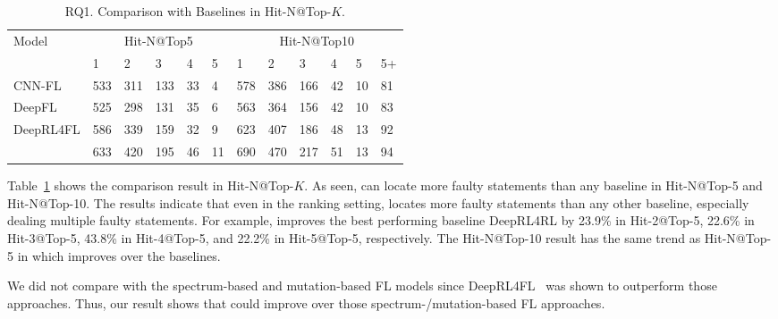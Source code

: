 





\begin{table}[t]
	\caption{RQ1. Comparison with Baselines in Hit-N@Top-$K$.}
        \vspace{-6pt}
	{\small
		\begin{center}
			\renewcommand{\arraystretch}{1}
			\begin{tabular}{p{1.5cm}<{\centering}|p{0.3cm}<{\centering}|p{0.3cm}<{\centering}|p{0.3cm}<{\centering}|p{0.2cm}<{\centering}|p{0.2cm}<{\centering}|p{0.3cm}<{\centering}|p{0.3cm}<{\centering}|p{0.3cm}<{\centering}|p{0.2cm}<{\centering}|p{0.2cm}<{\centering}|p{0.2cm}<{\centering}}
				\hline
				\multirow{2}{*}{Model}    & \multicolumn{5}{c|}{Hit-N@Top5}& \multicolumn{6}{c}{Hit-N@Top10}\\
				\cline{2-12}
											 &1&2&3&4&5&1&2&3&4&5&5+\\
				
				\hline
				CNN-FL      & 533 & 311 & 133 & 33 & 4 & 578 & 386 & 166 & 42 & 10 & 81 \\
				DeepFL		& 525 & 298 & 131 & 35 & 6 & 563 & 364 & 156 & 42 & 10 & 83 \\
				DeepRL4FL	& 586 & 339 & 159 & 32 & 9 & 623 & 407 & 186 & 48 & 13 & 92 \\
				\hline
				\tool       & 633 & 420 & 195 & 46 & 11& 690 & 470 & 217 & 51 & 13 & 94 \\
				\hline
			\end{tabular}
			
			\label{fig:rq1-2}
		\end{center}
	}
\end{table}

Table~\ref{fig:rq1-2} shows the comparison result in Hit-N@Top-$K$.
As seen, {\tool} can locate more faulty statements than any baseline
in Hit-N@Top-5 and Hit-N@Top-10. The results indicate that even in the
ranking setting, {\tool} locates more faulty statements than
any other baseline, especially dealing multiple faulty statements. For
example, {\tool} improves the best performing baseline DeepRL4RL by
23.9\% in Hit-2@Top-5, 22.6\% in Hit-3@Top-5, 43.8\% in Hit-4@Top-5,
and 22.2\% in Hit-5@Top-5, respectively. The Hit-N@Top-10 result has
the same trend as Hit-N@Top-5 in which {\tool} improves over the
baselines.

We did not compare with the spectrum-based and mutation-based FL
models since DeepRL4FL~\cite{icse21-fl} was shown to outperform
those approaches. Thus, our result shows that {\tool}
could improve over those spectrum-/mutation-based FL approaches.
